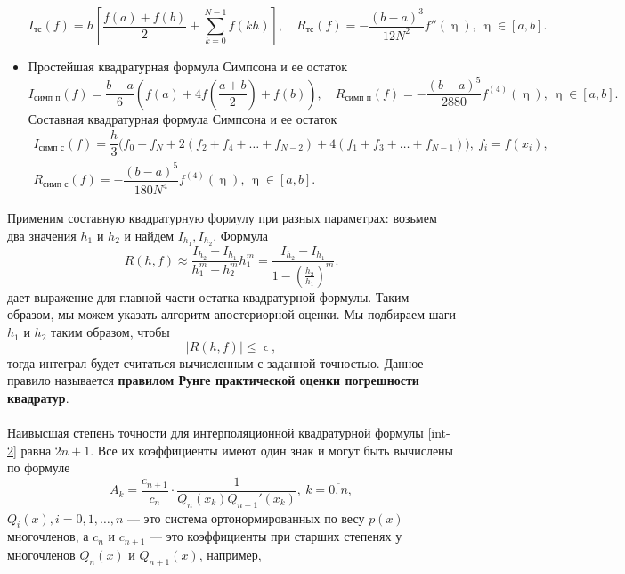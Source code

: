 \documentclass[a4paper, 12pt]{report}
\numberwithin{equation}{section}
\renewcommand{\leq}{\leqslant}
\renewcommand{\eta}{\upeta}
\renewcommand{\varepsilon}{\upvarepsilon}
\begin{document}
\begin{itemize}
         \begin{equation}
	 	I_\text{тс}(f) = h\left[\dfrac{f(a)+f(b)}{2} + \sum_{k=0}^{N-1}f(kh)\right],\quad R_\text{тс}(f) = -\dfrac{(b-a)^3}{12N^2}f''(\eta),\ \eta \in [a,b].
	 \end{equation}
     \item Простейшая квадратурная формула Симпсона и ее остаток
         \begin{equation}
	 	I_\text{симп п}(f) = \dfrac{b-a}{6}\left(f(a) + 4f\left(\dfrac{a+b}{2}\right) + f(b)\right),\quad R_\text{симп п}(f) = -\dfrac{(b-a)^5}{2880}f^{(4)}(\eta), \ \eta \in [a,b].
	 \end{equation}
     Составная квадратурная формула Симпсона и ее остаток
         \begin{equation}
         \begin{gathered}
             I_\text{симп с}(f) = \dfrac{h}{3}\big(f_0 + f_N + 2(f_2 + f_4 + \ldots + f_{N-2}) + 4(f_1 + f_3 + \ldots + f_{N-1})\big),\ f_i = f(x_i),\\ R_\text{симп с}(f) = -\dfrac{(b-a)^5}{180N^4}f^{(4)}(\eta),\ \eta \in [a,b].
         \end{gathered}
	 \end{equation}
    \end{itemize}
    Применим составную квадратурную формулу при разных параметрах: возьмем два значения $h_1$ и $h_2$ и найдем $I_{h_1}, I_{h_2}$.
    Формула \begin{equation}
	 	R(h,f)\approx \dfrac{I_{h_2}-I_{h_1}}{h_1^m - h_2^m}h_1^m = \dfrac{I_{h_2}-I_{h_1}}{1 - \left(\frac{h_2}{h_1}\right)^m}.
	 \end{equation} дает выражение для главной части остатка квадратурной формулы. Таким образом, мы можем указать алгоритм апостериорной оценки. Мы подбираем шаги $h_1$ и $h_2$ таким образом, чтобы $$|R(h,f)|\leq \varepsilon,$$ тогда интеграл будет считаться вычисленным с заданной точностью. Данное правило называется \textbf{правилом Рунге практической оценки погрешности квадратур}.
	 \\\\
	 Наивысшая степень точности для интерполяционной квадратурной формулы \eqref{int-2} равна $2n+1$. Все их коэффициенты имеют один знак и могут быть вычислены по формуле
	 $$A_k=\dfrac{c_{n+1}}{c_n}\cdot \dfrac{1}{Q_n(x_k)Q_{n+1}'(x_k)},\ k=\overline{0,n},$$
	 $Q_i(x), i=0,1,\ldots,n$ --- это система ортонормированных по весу $p(x)$ многочленов, а $c_n$ и $c_{n+1}$ --- это коэффициенты при старших степенях у многочленов $Q_n(x)$ и $Q_{n+1}(x)$, например,
\end{document}
